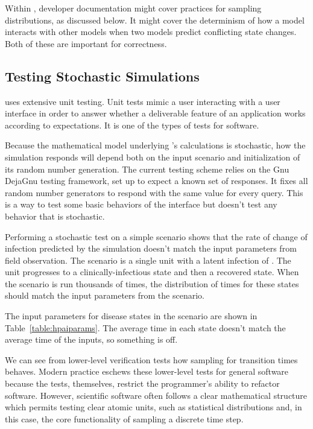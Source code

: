 \documentclass{article}
\begin{document}
Within \naadsm, developer documentation might cover practices
for sampling distributions, as discussed below. It might cover
the determinism of how a model interacts with other models
when two models predict conflicting state changes. Both of these
are important for correctness.


\subsection{Testing Stochastic Simulations}

\naadsm uses extensive unit testing. Unit tests mimic
a user interacting with a user interface in order to
answer whether a deliverable feature of an application
works according to expectations. It is one of the types
of tests for software.

Because the mathematical model underlying \naadsm's
calculations is stochastic, how the simulation responds
will depend both on the input scenario and initialization
of its random number generation. The current testing scheme
relies on the Gnu DejaGnu testing framework, set up to
expect a known set of responses. It fixes all random number
generators to respond with the same value for every query.
This is a way to test some basic behaviors of the interface
but doesn't test any behavior that is stochastic.

Performing a stochastic test on a simple scenario shows
that the rate of change of infection predicted by the
simulation doesn't match the input parameters from field
observation. The scenario is a single unit with a latent
infection of \hpai. The unit progresses to a clinically-infectious
state and then a recovered state. When the scenario is
run thousands of times, the distribution of
times for these states should match the input
parameters from the \hpai scenario.

The input parameters for disease states in the \hpai
scenario are shown in Table~\ref{table:hpaiparams}.
The average time in each state doesn't match
the average time of the inputs, so something is off.


We can see from lower-level verification tests how
sampling for transition times behaves.
Modern practice eschews these lower-level
tests for general software because
the tests, themselves, restrict the programmer's ability to refactor
software. However, scientific software often follows a clear
mathematical structure which permits testing clear atomic units,
such as statistical distributions and, in this case, the core
functionality of sampling a discrete time step.
\end{document}
